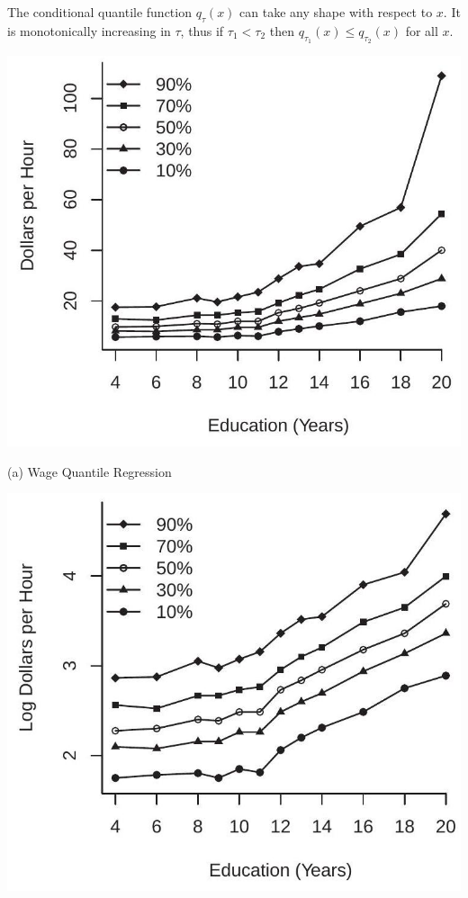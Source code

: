 \documentclass[10pt]{article}
\begin{document}
The conditional quantile function $q_{\tau}(x)$ can take any shape with respect to $x$. It is monotonically increasing in $\tau$, thus if $\tau_{1}<\tau_{2}$ then $q_{\tau_{1}}(x) \leq q_{\tau_{2}}(x)$ for all $x$.

\includegraphics[max width=\textwidth]{2022_10_23_47027c652ef567187a65g-05}

(a) Wage Quantile Regression

\includegraphics[max width=\textwidth]{2022_10_23_47027c652ef567187a65g-05(1)}
\end{document}
